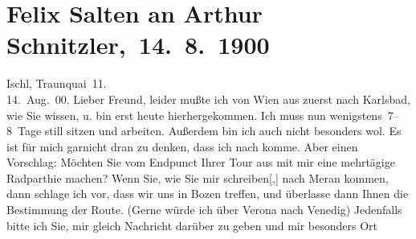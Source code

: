 

         
         \renewcommand{\erwaehntePersonen}{Personen: Oskar Mayer, Felix Salten}
         \renewcommand{\erwaehnteOrte}{Orte: Ala, Bad Ischl, Bludenz, Bozen, Innsbruck, Karlsbad, Meran, Schruns, Schweiz, Traunkai, Triest, Venedig, Verona, Wien}
         \renewcommand{\erwaehnteWerke}{}
               \section[ Felix Salten an Arthur Schnitzler, 14. 8. 1900]{ Felix Salten an Arthur Schnitzler, 14. 8. 1900}\nopagebreak{}\rehead{ }\begin{ledgroupsized}[t]{13cm}\normalsize\beginnumbering{} \toendnotes[C]{\smallbreak\pagebreak[2]} 
\toendnotes[C]{\smallbreak}\pstart
           \raggedleft{}{\pb}Ischl, Traunquai 11. {\\}14. Aug. 00.\pend
           \pstart
           Lieber Freund, leider mußte ich von Wien aus zuerst nach Karlsbad, wie Sie
               wissen, u. bin erst heute hierhergekommen. Ich muss
               nun wenigstens 7–8 Tage still sitzen und arbeiten. Außerdem bin ich auch nicht
               besonders wol. Es ist für mich garnicht dran zu denken, dass ich nach \label{K_L03310-1v}\label{K_L03310-1h} komme. Aber einen Vorschlag: Möchten Sie vom Endpunct Ihrer Tour aus mit mir
               eine mehrtägige Radparthie machen? Wenn Sie, wie Sie mir
                  schreiben{[},{]} nach Meran
               kommen, dann schlage ich vor, dass wir uns in Bozen treffen, und überlasse dann Ihnen die Bestimmung der Route. (Gerne {\pb}würde ich über Verona nach Venedig)
               Jedenfalls bitte ich Sie, mir gleich Nachricht darüber zu geben und mir besonders Ort

\end{ledgroupsized}
